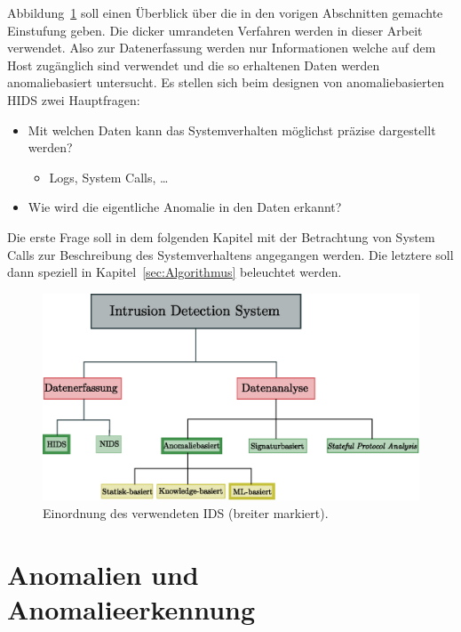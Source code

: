         Abbildung~\ref{fig:IDSOverview} soll einen Überblick über die in den vorigen Abschnitten gemachte Einstufung geben.
        Die dicker umrandeten Verfahren werden in dieser Arbeit verwendet.
        Also zur Datenerfassung werden nur Informationen welche auf dem Host zugänglich sind verwendet 
        und die so erhaltenen Daten werden anomaliebasiert untersucht.
        Es stellen sich beim designen von anomaliebasierten HIDS zwei Hauptfragen:
        \begin{itemize}
            \item Mit welchen Daten kann das Systemverhalten möglichst präzise dargestellt werden?
                \begin{itemize}
                    \item Logs, System Calls, \dots
                \end{itemize}
            \item Wie wird die eigentliche Anomalie in den Daten erkannt?
        \end{itemize}
        Die erste Frage soll in dem folgenden Kapitel mit der Betrachtung von System Calls zur Beschreibung des Systemverhaltens angegangen werden.
        Die letztere soll dann speziell in Kapitel~\ref{sec:Algorithmus} beleuchtet werden.

        \begin{figure}[h]
            \centering
            \includegraphics[width=1\textwidth]{images/Illustrationen/IDS/IDSOverview}
            \caption{Einordnung des verwendeten IDS (breiter markiert).}
            \label{fig:IDSOverview}
        \end{figure}

    \section{Anomalien und Anomalieerkennung}
    \label{sec:Anomalieerkennung}


